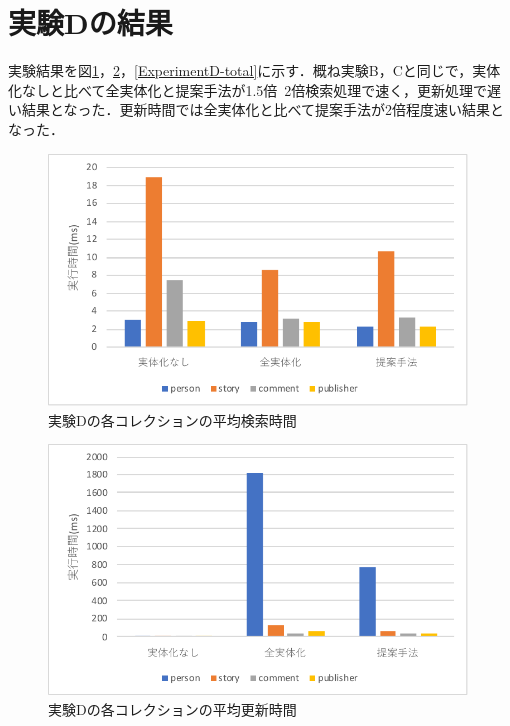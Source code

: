 \documentclass[a4paper,11pt]{ujreport}
\begin{document}
\section{実験Dの結果}
実験結果を図\ref{ExperimentD-find}，\ref{ExperimentD-update}，\ref{ExperimentD-total}に示す．概ね実験B，Cと同じで，実体化なしと比べて全実体化と提案手法が1.5倍~2倍検索処理で速く，更新処理で遅い結果となった．更新時間では全実体化と比べて提案手法が2倍程度速い結果となった．
\begin{figure}[htbp]
	\begin{center}
		\includegraphics[width=30em]{src/ExperimentD-find.pdf} %
	\end{center}
	\caption{実験Dの各コレクションの平均検索時間}
	\label{ExperimentD-find}
\end{figure}
\begin{figure}[htbp]
	\begin{center}
		\includegraphics[width=30em]{src/ExperimentD-update.pdf} %
	\end{center}
	\caption{実験Dの各コレクションの平均更新時間}
	\label{ExperimentD-update}
\end{figure}
\end{document}
